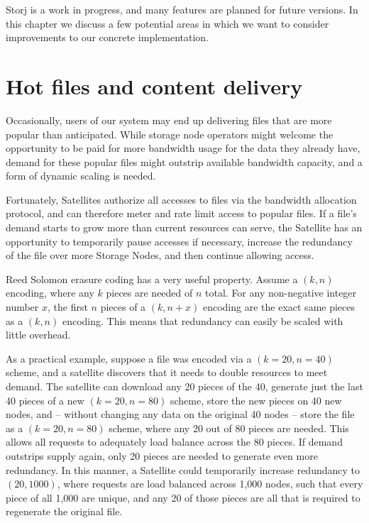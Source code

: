 \documentclass[8pt,fleqn,openany]{book}
\begin{document}
Storj is a work in progress, and many features are planned for future
versions. In this chapter we discuss a few potential areas in which we want to
consider improvements to our concrete implementation.

\section{Hot files and content delivery}\label{sec:future-hot-files}

Occasionally, users of our system may end up delivering files that are more
popular than anticipated. While storage node operators might welcome the
opportunity to be paid for more bandwidth usage for the data they already have,
demand for these popular files might outstrip available bandwidth capacity,
and a form of dynamic scaling is needed.

Fortunately, Satellites authorize all accesses to files via the bandwidth
allocation protocol, and can therefore meter and rate limit access to popular
files. If a file's demand starts to grow more than current resources can serve,
the Satellite has an opportunity to temporarily pause accesses if necessary,
increase the redundancy of the file over more Storage Nodes, and then continue
allowing access.

Reed Solomon erasure coding has a very useful property. Assume a $(k, n)$
encoding, where any $k$ pieces are needed of $n$ total. For any non-negative
integer number $x$, the first $n$ pieces of a $(k, n+x)$ encoding are the exact
same pieces as a $(k, n)$ encoding. This means that redundancy can easily be
scaled with little overhead.

As a practical example, suppose a file was encoded via a $(k=20, n=40)$ scheme,
and a satellite discovers that it needs to double resources to meet demand.
The satellite can download any 20 pieces of the 40, generate just the last 40
pieces of a new $(k=20, n=80)$ scheme, store the new pieces on 40 new nodes,
and -- without changing any data on the original 40 nodes -- store the file
as a $(k=20, n=80)$ scheme, where any 20 out of 80 pieces are needed.
This allows all requests to adequately load balance across the 80 pieces.
If demand outstrips supply again, only 20 pieces are needed to generate even
more redundancy. In this manner, a Satellite could temporarily increase
redundancy to $(20, 1000)$, where requests are load balanced across 1,000 nodes,
such that every piece of all 1,000 are unique, and any 20 of those pieces are
all that is required to regenerate the original file.
\end{document}

